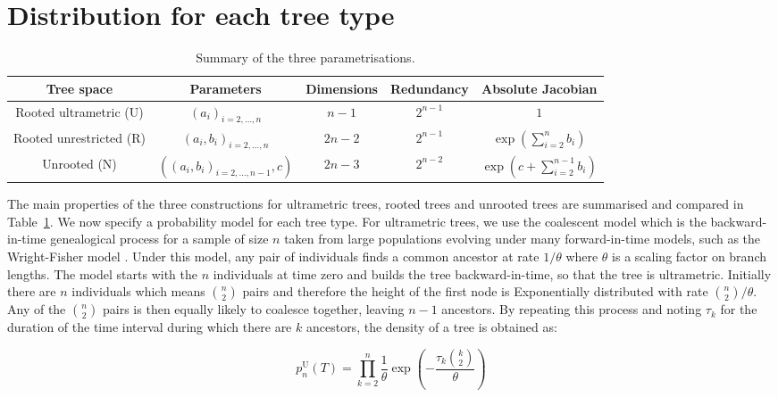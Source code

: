 \documentclass{article}
\begin{document}
\section{Distribution for each tree type}

\begin{table}[t]
\begin{center}
\begin{tabular}{|c||c|c|c|c|}
\hline
Tree space & Parameters & Dimensions & Redundancy & Absolute Jacobian\\\hline\hline
Rooted ultrametric (U) & $(a_i)_{i=2,...,n}$ & $n-1$& $2^{n-1}$& $1$ \\\hline
Rooted unrestricted (R) & $(a_i,b_i)_{i=2,...,n}$ & $2n-2$& $2^{n-1}$& 
$\displaystyle \exp\!\left(\sum_{i=2}^{n} b_i\right)$ \\\hline
Unrooted (N) & $((a_i,b_i)_{i=2,...,n-1},c)$ & $2n-3$& $2^{n-2}$
& $\displaystyle \exp\!\left(c+\sum_{i=2}^{n-1} b_i\right)$ \\\hline
\end{tabular}
\end{center}
\caption{Summary of the three parametrisations. 
\label{tab:comparison}}
\end{table}

The main properties of the three constructions for ultrametric trees,
rooted trees and unrooted trees
are summarised and compared in Table~\ref{tab:comparison}.
We now specify a probability model for each tree type.
For ultrametric trees, we use
the coalescent model \citep{Kingman1982,Kingman1982a} which is the backward-in-time
genealogical process for a sample of size $n$ taken from large populations evolving under
many forward-in-time models, such as the Wright-Fisher model \citep{Wright1931,Fisher1930}. Under this model, any pair of individuals
finds a common ancestor at rate $1/\theta$ where $\theta$ is a
scaling factor on branch lengths. 
The model starts with the $n$ individuals
at time zero and builds the tree backward-in-time, so that the tree is ultrametric.
Initially there are $n$ individuals which means $n \choose 2$ pairs 
and therefore the height of the first node 
is Exponentially distributed with rate ${n \choose 2}/\theta$. Any of the $n \choose 2$
pairs is then equally likely to coalesce together, leaving $n-1$ ancestors. By repeating this process
and noting $\tau_k$ for the duration of the time interval during which there are $k$
ancestors, the density of a tree is obtained as:

\begin{equation}
p_n^\mathrm{U}(T)=\prod_{k=2}^n \frac{1}{\theta}\exp\left(-\frac{\tau_k {k \choose 2}}{\theta} \right)
\label{eq:tree-distrib1}
\end{equation}
\end{document}
